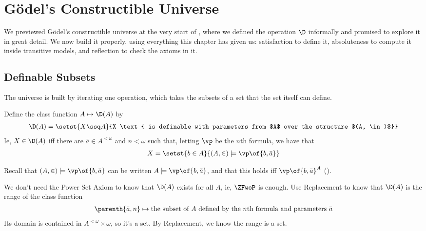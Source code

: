 \section{Gödel's Constructible Universe}

We previewed Gödel's constructible universe at the very start of , where we defined the operation $\D$ informally and promised to explore it in great detail. We now build it properly, using everything this chapter has given us: satisfaction to define it, absoluteness to compute it inside transitive models, and reflection to check the axioms in it.

\subsection{Definable Subsets}

The universe is built by iterating one operation, which takes the subsets of a set that the set itself can define.

\begin{boxdefinition}
    Define the class function $A \mapsto \D(A)$ by
    \begin{align*}
        \D(A) = \setst{X \ssq A}{X \text{ is definable with parameters from $A$ over the structure $(A, \in)$}}
    \end{align*}
    Ie, $X \in \D(A)$ iff there are $\bar{a} \in A^{<\omega}$ and $n < \omega$ such that, letting $\vp$ be the $n$th formula, we have that
    \begin{align*}
        X = \setst{b \in A}{(A, \in) \models \vp\of{b, \bar{a}}}
    \end{align*}
\end{boxdefinition}

Recall that $(A, \in) \models \vp\of{b, \bar{a}}$ can be written $A \models \vp\of{b, \bar{a}}$, and that this holds iff $\vp\of{b, \bar{a}}^A$ ().

We don't need the Power Set Axiom to know that $\D(A)$ exists for all $A$, ie, $\ZFwoP$ is enough. Use Replacement to know that $\D(A)$ is the range of the class function
\begin{align*}
    \parenth{\bar{a}, n} \mapsto \text{the subset of $A$ defined by the $n$th formula and parameters $\bar{a}$}
\end{align*}
Its domain is contained in $A^{<\omega} \times \omega$, so it's a set. By Replacement, we know the range is a set.

